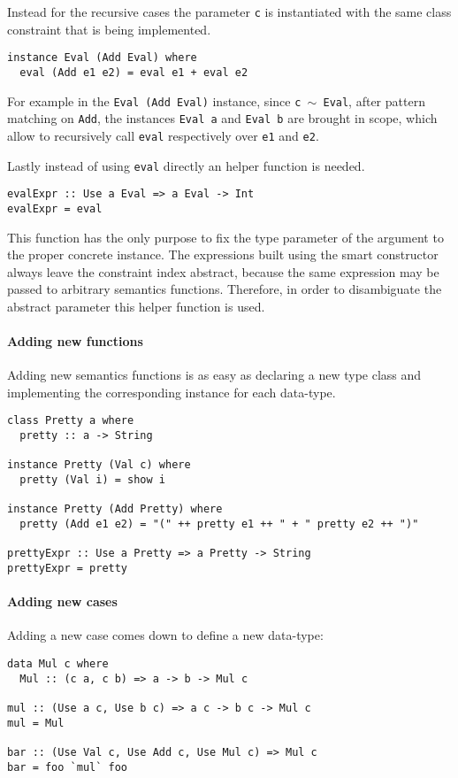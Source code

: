 \documentclass[../Thesis.tex]{subfiles}
\begin{document}
Instead for the recursive cases the parameter \texttt{c} is instantiated with the same class constraint that is being implemented. 

\begin{verbatim}  
instance Eval (Add Eval) where
  eval (Add e1 e2) = eval e1 + eval e2
  \end{verbatim}

For example in the \texttt{Eval (Add Eval)} instance, since \texttt{c $\sim$ Eval}, after pattern matching on \texttt{Add}, the instances \texttt{Eval a} and
\texttt{Eval b} are brought in scope, which allow to recursively call
\texttt{eval} respectively over \texttt{e1} and \texttt{e2}.

Lastly instead of using \texttt{eval} directly an helper function is needed.

\begin{verbatim}
evalExpr :: Use a Eval => a Eval -> Int
evalExpr = eval
\end{verbatim}

This function has the only purpose to fix the type parameter of the argument to the proper concrete instance.
The expressions built using the smart constructor always leave the constraint index abstract, because the same expression may be passed to 
arbitrary semantics functions. Therefore, in order to disambiguate the abstract
parameter this helper function is used.

\paragraph{Adding new functions}
Adding new semantics functions is as easy as declaring a new type class and 
implementing the corresponding instance for each data-type.
\begin{verbatim}
class Pretty a where
  pretty :: a -> String

instance Pretty (Val c) where
  pretty (Val i) = show i  

instance Pretty (Add Pretty) where
  pretty (Add e1 e2) = "(" ++ pretty e1 ++ " + " pretty e2 ++ ")"

prettyExpr :: Use a Pretty => a Pretty -> String
prettyExpr = pretty
\end{verbatim}

\paragraph{Adding new cases}
Adding a new case comes down to define a new data-type:
\begin{verbatim}
data Mul c where
  Mul :: (c a, c b) => a -> b -> Mul c

mul :: (Use a c, Use b c) => a c -> b c -> Mul c
mul = Mul

bar :: (Use Val c, Use Add c, Use Mul c) => Mul c
bar = foo `mul` foo
\end{verbatim}
\end{document}
